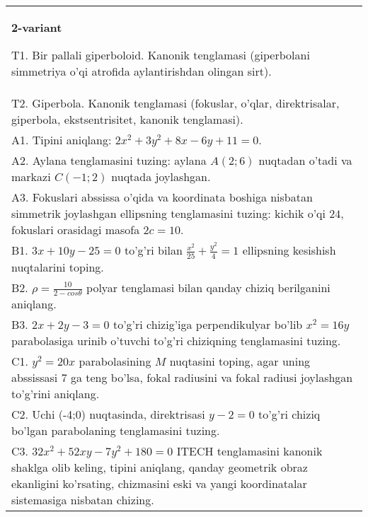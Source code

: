 \documentclass{article}
\begin{document}
\begin{tabular}{m{17cm}}
\textbf{2-variant}
\newline

T1. Bir pallali giperboloid. Kanonik tenglamasi (giperbolani simmetriya o'qi atrofida aylantirishdan olingan sirt).\\

T2. Giperbola. Kanonik tenglamasi (fokuslar, o'qlar, direktrisalar, giperbola, ekstsentrisitet, kanonik tenglamasi).\\

A1. Tipini aniqlang: $2x^{2}+3y^{2}+8x-6y+11=0$.\\

A2. Aylana tenglamasini tuzing: aylana $A(2;6)$ nuqtadan o'tadi va markazi $C(-1;2)$ nuqtada joylashgan.\\

A3. Fokuslari abssissa o'qida va koordinata boshiga nisbatan simmetrik joylashgan ellipsning tenglamasini tuzing: kichik o'qi $24$, fokuslari orasidagi masofa $2c=10$.\\

B1. $3x + 10y - 25 = 0$ to'g'ri bilan $\frac{x^{2}}{25} + \frac{y^{2}}{4} = 1$ ellipsning kesishish nuqtalarini toping.  \\

B2. $\rho = \frac{10}{2 - cos\theta}$ polyar tenglamasi bilan qanday chiziq berilganini aniqlang.  \\

B3. $2x + 2y - 3 = 0$ to'g'ri chizig'iga perpendikulyar bo'lib $x^{2} = 16y$ parabolasiga urinib o'tuvchi to'g'ri chiziqning tenglamasini tuzing.  \\

C1. $y^{2} = 20x$ parabolasining $M$ nuqtasini toping, agar uning abssissasi 7 ga teng bo'lsa, fokal radiusini va fokal radiusi joylashgan to'g'rini aniqlang.\\

C2. Uchi (-4;0) nuqtasinda, direktrisasi $y - 2 = 0$ to'g'ri chiziq bo'lgan parabolaning tenglamasini tuzing.\\

C3. $32x^{2} + 52xy - 7y^{2} + 180 = 0$ ITECH tenglamasini kanonik shaklga olib keling, tipini aniqlang, qanday geometrik obraz ekanligini ko'rsating, chizmasini eski va yangi koordinatalar sistemasiga nisbatan chizing.  \\

\end{tabular}
\vspace{1cm}
\end{document}
